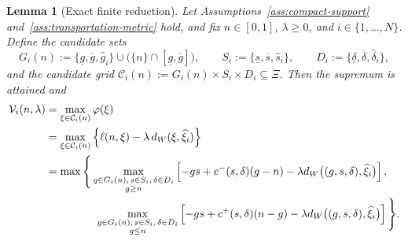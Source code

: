 \documentclass[11pt]{article}
\newcommand{\XiSet}{\Xi}
\newcommand{\hxi}{\widehat\xi}
\theoremstyle{plain}
\newtheorem{lemma}{Lemma}
\theoremstyle{definition}
\begin{document}
\begin{lemma}[Exact finite reduction]
\label{lemma:candidate-sets}
Let Assumptions~\ref{ass:compact-support} and~\ref{ass:transportation-metric} hold, and fix $n\in[0,1]$, $\lambda\ge0$, and $i\in\{1,\dots,N\}$. Define the candidate sets
\[
    G_i(n)
    :=
    \{\underline g,\overline g,\widehat g_i\}
    \cup
    \bigl(\{n\}\cap[\underline g,\overline g]\bigr),
    \qquad
    S_i:=\{\underline s,\overline s,\widehat s_i\},
    \qquad
    D_i:=\{\underline\delta,\overline\delta,\widehat\delta_i\},
\]
and the candidate grid $\mathcal C_i(n):=G_i(n)\times S_i\times D_i\subseteq\XiSet$.
Then the supremum is attained and
\begin{align}
\label{eq:finite-separation}
\mathcal V_i(n,\lambda)
&= \max_{\xi\in\mathcal C_i(n)} \varphi(\xi)\notag\\
&=
\max_{\xi\in\mathcal C_i(n)}
\left\{
    \ell(n,\xi)-\lambda\,d_W(\xi,\hxi_i)
\right\} \notag\\
&=
\max\Bigg\{
    \max_{\substack{
        g\in G_i(n),\,s\in S_i,\,\delta\in D_i\\
        g\ge n
    }}
    \left[
        -gs+c^-(s,\delta)(g-n)
        -\lambda d_W\bigl((g,s,\delta),\hxi_i\bigr)
    \right],
    \notag\\
&\hspace{1.6cm}
    \max_{\substack{
        g\in G_i(n),\,s\in S_i,\,\delta\in D_i\\
        g\le n
    }}
    \left[
        -gs+c^+(s,\delta)(n-g)
        -\lambda d_W\bigl((g,s,\delta),\hxi_i\bigr)
    \right]
\Bigg\}.
\end{align}
\end{lemma}
 
\end{document}
